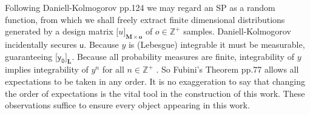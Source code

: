 \documentclass[preprint,12pt]{elsarticle}
\newcommand*{\x}{\times}
\newcommand*{\mi}[1]{\mathbf{#1}}
\newcommand*{\st}[1]{\mathbb{#1}}
\newcommand*{\rv}[1]{\mathsf{#1}}
\newcommand*{\tte}[2][]{\lbrack{#2}\rbrack_{#1}}
\begin{document}
    Following Daniell-Kolmogorov \cite{Rogers.Williams2000} pp.124 we may regard an SP as a random function, from which we shall freely extract finite dimensional distributions generated by a design matrix $\tte[\mi{M\x o}]{u}$ of $o \in \st{Z}^{+}$ samples.
    Daniell-Kolmogorov incidentally secures $\rv{u}$. 
    Because $y$ is (Lebesgue) integrable it must be measurable, guaranteeing $\tte[\mi{L}]{\rv{y_0}}$.
    Because all probability measures are finite, integrability of $y$ implies integrability of $y^n$ for all $n \in \st{Z}^{+}$ \cite{Villani1985}. 
    So Fubini's Theorem \cite{Williams1991} pp.77 allows all expectations to be taken in any order. It is no exaggeration to say that changing the order of expectations is the vital tool in the construction of this work. These observations suffice to ensure every object appearing in this work.
\end{document}
